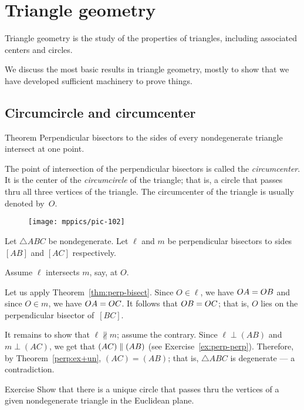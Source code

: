 \chapter{Triangle geometry}\label{chap:triangle}

Triangle geometry is the study of the properties of triangles, including associated centers and circles.

We discuss the most basic results in triangle geometry, 
mostly to show that we have developed sufficient machinery to prove things.

\section{Circumcircle and circumcenter}

\begin{thm}{Theorem}\label{thm:circumcenter}
Perpendicular bisectors to the sides of every nondegenerate triangle intersect at one point.
\end{thm}

The point of intersection of the perpendicular bisectors is called the \emph{circumcenter}.
It is the center of the \emph{circumcircle} of the triangle;
that is, a circle that passes thru all three vertices of the triangle.
The circumcenter of the triangle is usually denoted by~$O$.

\begin{wrapfigure}{o}{29mm}
\centering
\texttt{[image: mppics/pic-102]}
\end{wrapfigure}


Let $\triangle ABC$ be nondegenerate.
Let $\ell$ and $m$ be perpendicular bisectors to sides $[AB]$ and $[AC]$ respectively.

Assume $\ell$ intersects $m$, say, at $O$.

Let us apply Theorem~\ref{thm:perp-bisect}.
Since $O\in\ell$, we have $OA=OB$ and since $O\in m$, we have $OA=OC$.
It follows that $OB=OC$;
that is, $O$ lies on the perpendicular bisector of~$[B C]$.

It remains to show that $\ell\nparallel m$;
assume the contrary.
Since
$\ell\perp(AB)$ and $m\perp (AC)$, we get that $(AC)\parallel (AB)$ 
(see Exercise~\ref{ex:perp-perp}).
Therefore, by Theorem~\ref{perp:ex+un}, $(AC)=(AB)$;
that is, $\triangle ABC$ is degenerate --- a contradiction.
\qeds

\begin{thm}{Exercise}\label{ex:unique-cline}
Show that there is a unique circle that passes thru the vertices of a given nondegenerate triangle in the Euclidean plane.
\end{thm}



